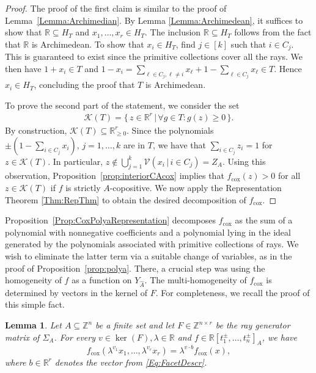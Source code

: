 \documentclass[a4paper,11pt]{amsart}
\newtheorem{lemma}[theorem]{Lemma}
\theoremstyle{definition}
\newcommand{\ZZ}{\mathbb{Z}}
\newcommand{\RR}{\mathbb{R}}
\newcommand{\cox}{\mathrm{cox}}
\begin{document}
\begin{proof}
The proof of the first claim is similar to the proof of Lemma~\ref{Lemma:Archimedian}.
  By Lemma \ref{Lemma:Archimedean}, it suffices to show that $\RR\subseteq H_{T}$ and $x_1,\dots,x_r\in H_T$.
  The inclusion $\RR\subseteq H_{T}$ follows from the fact that $\RR$ is Archimedean.
  To show that $x_i\in H_{T}$, find $j \in [k]$ such that $i \in C_j$.
  This is guaranteed to exist since the primitive collections cover all the rays. We then have $1+x_i\in T$ and $1-x_i=\sum_{\ell\in C_j, \ell \neq i}x_\ell+1-\sum_{\ell\in C_j}x_\ell\in T$. 
  Hence $x_i \in H_{T}$, concluding the proof that $T$ is Archimedean. 
  
To prove the second part of the statement, we consider the set
\begin{align*}
    \mathcal{K}(T) =\{ \, z \in \RR^r \,|\, \forall g\in T\colon g(z)\geq 0\,\}.
\end{align*}
By construction, $\mathcal{K}(T) \subseteq \mathbb{R}^r_{\geq0}$.
Since the polynomials $\pm(1-\sum_{i\in C_j}x_i), \, j=1,\dots,k$ are in $T$, we have that $\sum_{i\in C_j}z_i=1$ for $z \in \mathcal{K}(T)$.
In particular, $z \notin \bigcup_{j=1}^k\mathcal{V}(x_i \,|\, i\in C_j)=Z_A$.
Using this observation, Proposition~\ref{prop:interiorCAcox} implies that $f_\cox(z)>0$ for all $z \in \mathcal{K}(T)$  if $f$ is strictly $A$-copositive.
We now apply the Representation Theorem \ref{Thm:RepThm} to obtain the desired decomposition of $f_\cox$.
\end{proof}


Proposition~\ref{Prop:CoxPolyaRepresentation} decomposes $f_\cox$ as the sum of a polynomial with nonnegative coefficients and a polynomial lying in the ideal generated by the polynomials associated with primitive collections of rays. We wish to eliminate the latter term via a suitable change of variables, as in the proof of Proposition~\ref{prop:polya}. There, a crucial step was using the homogeneity of	$f$ as a function on $Y_{\hat{A}}$. The multi-homogeneity of $f_\cox$ is determined by vectors in the kernel of $F$. For completeness, we recall the proof of this simple fact.

\begin{lemma}
\label{Lemma:fCoxHomog}
    Let $A \subseteq \ZZ^n$ be a finite set and let $F \in \mathbb{Z}^{n \times r}$ be the ray generator matrix of $\Sigma_A$. For every $v \in \ker(F), \lambda \in \mathbb{R}$ and $f\in \RR[t_1^\pm,\dots,t_n^\pm]_A$, we have
    \[ f_\cox(\lambda^{v_1} x_1, \dots, \lambda^{v_r} x_r) = \lambda^{v\cdot b}f_\cox(x), \]
    where $b \in \RR^r$ denotes the vector from \eqref{Eq:FacetDescr}.
\end{lemma}
\end{document}
